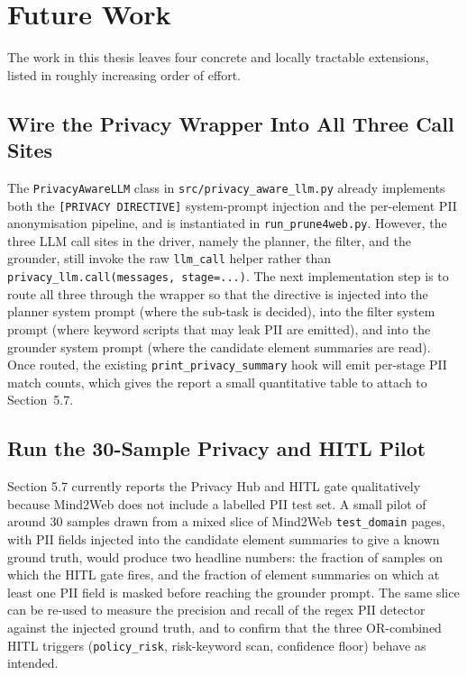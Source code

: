 \chapter{Future Work}

The work in this thesis leaves four concrete and locally tractable extensions, listed in roughly increasing order of effort.

\section{Wire the Privacy Wrapper Into All Three Call Sites}
The \texttt{PrivacyAwareLLM} class in \texttt{src/privacy\_aware\_llm.py} already implements both the \texttt{[PRIVACY DIRECTIVE]} system-prompt injection and the per-element PII anonymisation pipeline, and is instantiated in \texttt{run\_prune4web.py}. However, the three LLM call sites in the driver, namely the planner, the filter, and the grounder, still invoke the raw \texttt{llm\_call} helper rather than \texttt{privacy\_llm.call(messages, stage=...)}. The next implementation step is to route all three through the wrapper so that the directive is injected into the planner system prompt (where the sub-task is decided), into the filter system prompt (where keyword scripts that may leak PII are emitted), and into the grounder system prompt (where the candidate element summaries are read). Once routed, the existing \texttt{print\_privacy\_summary} hook will emit per-stage PII match counts, which gives the report a small quantitative table to attach to Section~5.7.

\section{Run the 30-Sample Privacy and HITL Pilot}
Section 5.7 currently reports the Privacy Hub and HITL gate qualitatively because Mind2Web does not include a labelled PII test set. A small pilot of around 30 samples drawn from a mixed slice of Mind2Web \texttt{test\_domain} pages, with PII fields injected into the candidate element summaries to give a known ground truth, would produce two headline numbers: the fraction of samples on which the HITL gate fires, and the fraction of element summaries on which at least one PII field is masked before reaching the grounder prompt. The same slice can be re-used to measure the precision and recall of the regex PII detector against the injected ground truth, and to confirm that the three OR-combined HITL triggers (\texttt{policy\_risk}, risk-keyword scan, confidence floor) behave as intended.


